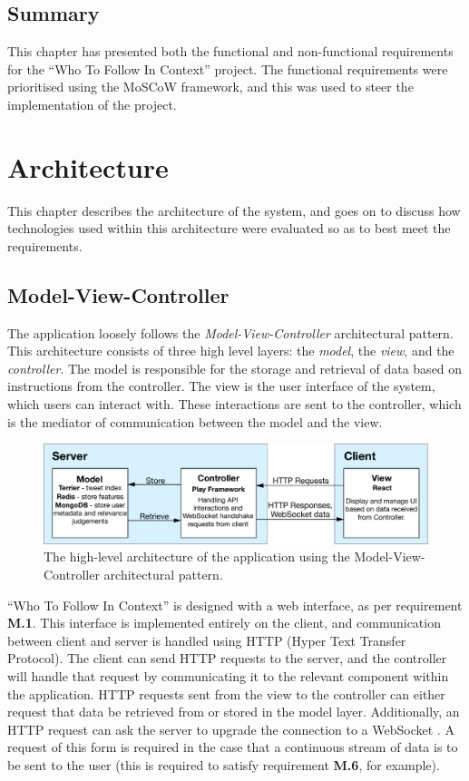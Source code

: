 \documentclass{l4proj}
\begin{document}
\section{Summary}
This chapter has presented both the functional and non-functional requirements for the ``Who To Follow In Context'' project. The functional requirements were prioritised using the MoSCoW framework, and this was used to steer the implementation of the project.

\chapter{Architecture}

This chapter describes the architecture of the system, and goes on to discuss how technologies used within this architecture were evaluated so as to best meet the requirements.
    
    \section{Model-View-Controller}
    The application loosely follows the \textit{Model-View-Controller} architectural pattern. This architecture consists of three high level layers: the \textit{model}, the \textit{view}, and the \textit{controller}. The model is responsible for the storage and retrieval of data based on instructions from the controller. The view is the user interface of the system, which users can interact with. These interactions are sent to the controller, which is the mediator of communication between the model and the view.
    
\begin{figure}[H]
\centering
\includegraphics[scale=0.70]{mvc.pdf}
\caption{The high-level architecture of the application using the Model-View-Controller architectural pattern.}
\label{mvc}
\end{figure}

``Who To Follow In Context'' is designed with a web interface, as per requirement \textbf{M.1}. This interface is implemented entirely on the client, and communication between client and server is handled using HTTP (Hyper Text Transfer Protocol). The client can send HTTP requests to the server, and the controller will handle that request by communicating it to the relevant component within the application. HTTP requests sent from the view to the controller can either request that data be retrieved from or stored in the model layer. Additionally, an HTTP request can ask the server to upgrade the connection to a WebSocket \cite{websocket}. A request of this form is required in the case that a continuous stream of data is to be sent to the user (this is required to satisfy requirement \textbf{M.6}, for example).
    
\end{document}
